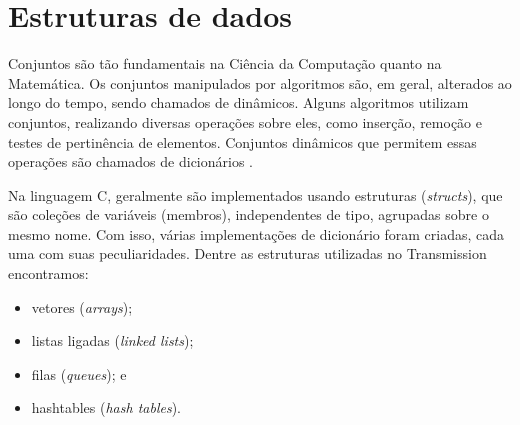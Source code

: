 
\section{Estruturas de dados}

Conjuntos são tão fundamentais na Ciência da Computação quanto na Matemática. Os
conjuntos manipulados por algoritmos são, em geral, alterados ao longo do tempo, sendo
chamados de dinâmicos. Alguns algoritmos utilizam conjuntos, realizando diversas
operações sobre eles, como inserção, remoção e testes de pertinência de elementos.
Conjuntos dinâmicos que permitem essas operações são chamados de dicionários
\cite{book:clrs}.

Na linguagem C, geralmente são implementados usando estruturas (\emph{structs}), que são
coleções de variáveis (membros), independentes de tipo, agrupadas sobre o mesmo nome.
Com isso, várias implementações de dicionário foram criadas, cada uma com suas
peculiaridades. Dentre as estruturas utilizadas no Transmission encontramos:

\begin{itemize}
    \item vetores (\emph{arrays});
    \item listas ligadas (\emph{linked lists});
    \item filas (\emph{queues}); e
    \item \glspl*{hashtable} (\emph{hash tables}).
\end{itemize}





